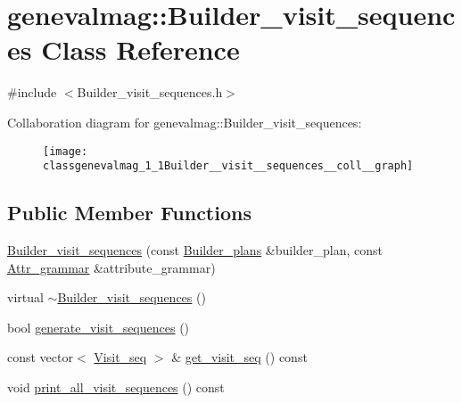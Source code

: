 \hypertarget{classgenevalmag_1_1Builder__visit__sequences}{
\section{genevalmag::Builder\_\-visit\_\-sequences Class Reference}
\label{classgenevalmag_1_1Builder__visit__sequences}
}


{\ttfamily \#include $<$Builder\_\-visit\_\-sequences.h$>$}



Collaboration diagram for genevalmag::Builder\_\-visit\_\-sequences:\nopagebreak
\begin{figure}[H]
\begin{center}
\leavevmode
\texttt{[image: classgenevalmag\_1\_1Builder\_\_visit\_\_sequences\_\_coll\_\_graph]}
\end{center}
\end{figure}
\subsection*{Public Member Functions}
\begin{DoxyCompactItemize}
\item 
\hyperlink{classgenevalmag_1_1Builder__visit__sequences_a14404a9245e81db0b848226b33c4705c}{Builder\_\-visit\_\-sequences} (const \hyperlink{classgenevalmag_1_1Builder__plans}{Builder\_\-plans} \&builder\_\-plan, const \hyperlink{classgenevalmag_1_1Attr__grammar}{Attr\_\-grammar} \&attribute\_\-grammar)
\item 
virtual \hyperlink{classgenevalmag_1_1Builder__visit__sequences_a9b86db069a7c5564cf802bef80599a7d}{$\sim$Builder\_\-visit\_\-sequences} ()
\item 
bool \hyperlink{classgenevalmag_1_1Builder__visit__sequences_a2721134ffe1c2677b96a46c4b4d184ef}{generate\_\-visit\_\-sequences} ()
\item 
const vector$<$ \hyperlink{namespacegenevalmag_a7720677d79b33ecca4db21cdbcf7908f}{Visit\_\-seq} $>$ \& \hyperlink{classgenevalmag_1_1Builder__visit__sequences_acf3c542e09500da73d78ddc757f136ec}{get\_\-visit\_\-seq} () const 
\item 
void \hyperlink{classgenevalmag_1_1Builder__visit__sequences_ad3073f1a763bdbd4812f64a16bb6a67d}{print\_\-all\_\-visit\_\-sequences} () const 
\end{DoxyCompactItemize}
